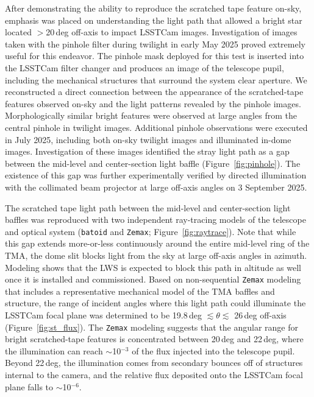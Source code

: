 \documentclass[SE,lsstdraft,authoryear,toc]{lsstdoc}
\begin{document}
After demonstrating the ability to reproduce the scratched tape feature on-sky, emphasis was placed on understanding the light path that allowed a bright star located $>$20\,deg off-axis to impact LSSTCam images. Investigation of images taken with the pinhole filter during twilight in early May 2025 proved extremely useful for this endeavor. The pinhole mask deployed for this test is inserted into the LSSTCam filter changer and produces an image of the telescope pupil, including the mechanical structures that surround the system clear aperture. We reconstructed a direct connection between the appearance of the scratched-tape features observed on-sky and the light patterns revealed by the pinhole images. Morphologically similar bright features were observed at large angles from the central pinhole in twilight images. Additional pinhole observations were executed in July 2025, including both on-sky twilight images and illuminated in-dome images. Investigation of these images identified the stray light path as a gap between the mid-level and center-section light baffle (Figure~\ref{fig:pinhole}). The existence of this gap was further experimentally verified by directed illumination with the collimated beam projector at large off-axis angles on 3 September 2025.


The scratched tape light path between the mid-level and center-section light baffles was reproduced with two independent ray-tracing models of the telescope and optical system (\texttt{batoid} and \texttt{Zemax}; Figure~\ref{fig:raytrace}). Note that while this gap extends more-or-less continuously around the entire mid-level ring of the TMA, the dome slit blocks light from the sky at large off-axis angles in azimuth. Modeling shows that the LWS is expected to block this path in altitude as well once it is installed and commissioned. Based on non-sequential \texttt{Zemax} modeling that includes a representative mechanical model of the TMA baffles and structure, the range of incident angles where this light path could illuminate the LSSTCam focal plane was determined to be 19.8\,deg $ \lesssim \theta \lesssim$ 26\,deg off-axis (Figure~\ref{fig:st_flux}). The \texttt{Zemax} modeling suggests that the angular range for bright scratched-tape features is concentrated between 20\,deg and 22\,deg, where the illumination can reach $\sim$10$^{-3}$ of the flux injected into the telescope pupil. Beyond 22\,deg, the illumination comes from secondary bounces off of structures internal to the camera, and the relative flux deposited onto the LSSTCam focal plane falls to $\sim$10$^{-6}$.
\end{document}
